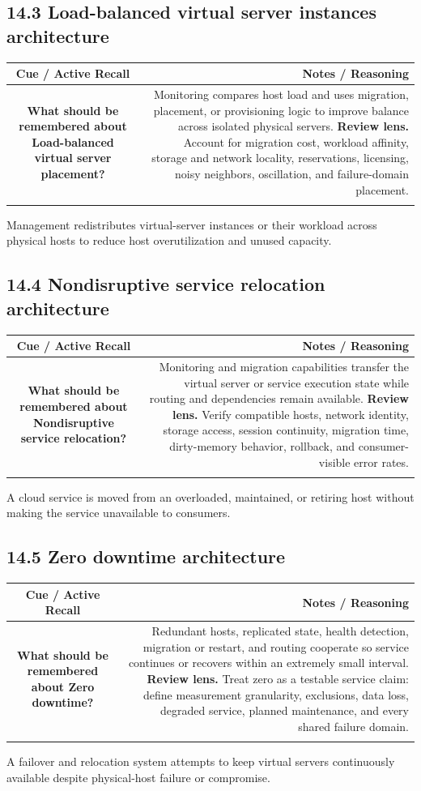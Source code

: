 \documentclass[11pt]{article}
\newcommand{\CornellHeader}{\rowcolor{Navy}\color{white}\bfseries Cue / Active Recall & \color{white}\bfseries Notes / Reasoning \\\endhead}
\newcommand{\CornellRow}[2]{\cellcolor{CueGray}\textbf{#1} & #2 \\\addlinespace[3pt]}
\begin{document}
\subsection{14.3 Load-balanced virtual server instances architecture}
\begin{longtable}{@{}C N@{}}
\CornellHeader
\CornellRow{What should be remembered about Load-balanced virtual server placement?}{Monitoring compares host load and uses migration, placement, or provisioning logic to improve balance across isolated physical servers. \textbf{Review lens.} Account for migration cost, workload affinity, storage and network locality, reservations, licensing, noisy neighbors, oscillation, and failure-domain placement.}
\end{longtable}
\begin{sectionsummarybox}
Management redistributes virtual-server instances or their workload across physical hosts to reduce host overutilization and unused capacity.
\end{sectionsummarybox}
\subsection{14.4 Nondisruptive service relocation architecture}
\begin{longtable}{@{}C N@{}}
\CornellHeader
\CornellRow{What should be remembered about Nondisruptive service relocation?}{Monitoring and migration capabilities transfer the virtual server or service execution state while routing and dependencies remain available. \textbf{Review lens.} Verify compatible hosts, network identity, storage access, session continuity, migration time, dirty-memory behavior, rollback, and consumer-visible error rates.}
\end{longtable}
\begin{sectionsummarybox}
A cloud service is moved from an overloaded, maintained, or retiring host without making the service unavailable to consumers.
\end{sectionsummarybox}
\subsection{14.5 Zero downtime architecture}
\begin{longtable}{@{}C N@{}}
\CornellHeader
\CornellRow{What should be remembered about Zero downtime?}{Redundant hosts, replicated state, health detection, migration or restart, and routing cooperate so service continues or recovers within an extremely small interval. \textbf{Review lens.} Treat zero as a testable service claim: define measurement granularity, exclusions, data loss, degraded service, planned maintenance, and every shared failure domain.}
\end{longtable}
\begin{sectionsummarybox}
A failover and relocation system attempts to keep virtual servers continuously available despite physical-host failure or compromise.
\end{sectionsummarybox}
\end{document}
